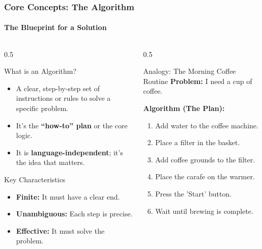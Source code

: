 \documentclass{beamer}
\begin{document}
\begin{frame}[fragile]
    \frametitle{Core Concepts: The Algorithm}
    \framesubtitle{The Blueprint for a Solution}
    
    \begin{columns}[T]
        \begin{column}{0.5\textwidth}
            \begin{block}{What is an Algorithm?}
                \begin{itemize}
                    \item A clear, step-by-step set of instructions or rules to solve a specific problem.
                    \item It's the \textbf{“how-to” plan} or the core logic.
                    \item It is \textbf{language-independent}; it’s the idea that matters.
                \end{itemize}
            \end{block}
            
            \begin{block}{Key Characteristics}
                \begin{itemize}
                    \item \textbf{Finite:} It must have a clear end.
                    \item \textbf{Unambiguous:} Each step is precise.
                    \item \textbf{Effective:} It must solve the problem.
                \end{itemize}
            \end{block}
        \end{column}
        \begin{column}{0.5\textwidth}
            \begin{block}{Analogy: The Morning Coffee Routine}
                \textbf{Problem:} I need a cup of coffee.
                \vspace{0.5em}
                
                \textbf{Algorithm (The Plan):}
                \begin{enumerate}
                    \item Add water to the coffee machine.
                    \item Place a filter in the basket.
                    \item Add coffee grounds to the filter.
                    \item Place the carafe on the warmer.
                    \item Press the 'Start' button.
                    \item Wait until brewing is complete.
                \end{enumerate}
            \end{block}
        \end{column}
    \end{columns}
\end{frame}
\end{document}
